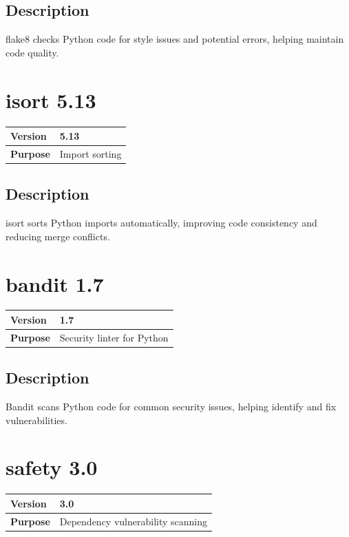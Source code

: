 \documentclass[12pt,a4paper]{report}
\begin{document}
\subsection{Description}

flake8 checks Python code for style issues and potential errors, helping maintain code quality.

\section{isort 5.13}

\begin{tabular}{|p{4cm}|p{10cm}|}
\hline
\textbf{Version} & 5.13 \\
\hline
\textbf{Purpose} & Import sorting \\
\hline
\end{tabular}

\subsection{Description}

isort sorts Python imports automatically, improving code consistency and reducing merge conflicts.

\section{bandit 1.7}

\begin{tabular}{|p{4cm}|p{10cm}|}
\hline
\textbf{Version} & 1.7 \\
\hline
\textbf{Purpose} & Security linter for Python \\
\hline
\end{tabular}

\subsection{Description}

Bandit scans Python code for common security issues, helping identify and fix vulnerabilities.

\section{safety 3.0}

\begin{tabular}{|p{4cm}|p{10cm}|}
\hline
\textbf{Version} & 3.0 \\
\hline
\textbf{Purpose} & Dependency vulnerability scanning \\
\hline
\end{tabular}
\end{document}
